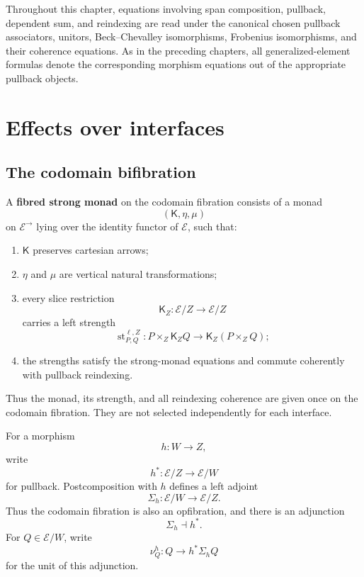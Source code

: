 Throughout this chapter, equations involving span composition, pullback,
dependent sum, and reindexing are read under the canonical chosen pullback
associators, unitors, Beck--Chevalley isomorphisms, Frobenius isomorphisms,
and their coherence equations.  As in the preceding chapters, all
generalized-element formulas denote the corresponding morphism equations out
of the appropriate pullback objects.

\section{Effects over interfaces}
\label{sec:effects-over-interfaces}

\subsection{The codomain bifibration}
\label{subsec:codomain-bifibration-effects}

\begin{definition}
\label{def:fibred-strong-monad}
A \textbf{fibred strong monad} on the codomain fibration consists of a monad
\[
    (\mathsf K,\eta,\mu)
\]
on \(\mathcal E^{\to}\) lying over the identity functor of \(\mathcal E\),
such that:
\begin{enumerate}
    \item \(\mathsf K\) preserves cartesian arrows;

    \item \(\eta\) and \(\mu\) are vertical natural transformations;

    \item every slice restriction
    \[
        \mathsf K_Z:\mathcal E/Z\to\mathcal E/Z
    \]
    carries a left strength
    \[
        \operatorname{st}^{\ell,Z}_{P,Q}:
        P\times_Z\mathsf K_ZQ
        \longrightarrow
        \mathsf K_Z(P\times_ZQ);
    \]

    \item the strengths satisfy the strong-monad equations and commute
    coherently with pullback reindexing.
\end{enumerate}
\end{definition}

Thus the monad, its strength, and all reindexing coherence are given once on
the codomain fibration.  They are not selected independently for each
interface.

For a morphism
\[
    h:W\longrightarrow Z,
\]
write
\[
    h^*:\mathcal E/Z\longrightarrow\mathcal E/W
\]
for pullback.  Postcomposition with \(h\) defines a left adjoint
\[
    \Sigma_h:\mathcal E/W\longrightarrow\mathcal E/Z.
\]
Thus the codomain fibration is also an opfibration, and there is an
adjunction
\[
    \Sigma_h\dashv h^*.
\]
For \(Q\in\mathcal E/W\), write
\[
    \nu^h_Q:
    Q\longrightarrow h^*\Sigma_hQ
\]
for the unit of this adjunction.

